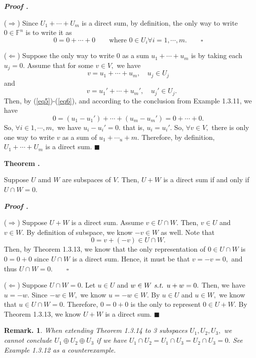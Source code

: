 \documentclass[11pt, letterpaper]{article}
\newcounter{index}[subsection]
\newenvironment*{thm}[1]{\begin{tcolorbox}\par\noindent\textbf{Theorem \thesubsection.\stepcounter{index}\theindex\ #1} \par}{\par\end{tcolorbox}}
\newcounter{nprf}[subsection]
\newenvironment*{prf}{\par\indent\textbf{\textit{Proof \stepcounter{nprf}\thenprf.}}}{\hfill$\blacksquare$\par}
\newtheorem*{rmk}{Remark.}
\def\F{\mathbb{F}}
\def\st{\emph{ s.t. }}
\begin{document}
	\begin{prf}
		\par ($\Rightarrow$) Since $U_1+\cdots+U_m$ is a direct sum, by definition, the only way to write $0\in\F^n$ is to write it as \[0=0+\cdots+0\qquad\text{where }0\in U_i\forall i=1,\cdots,m.\qquad\square\]\par 
		($\Leftarrow$) Suppose the only way to write $0$ as a sum $u_1+\cdots+u_m$ is by taking each $u_j=0.$ Assume that for some $v\in V,$ we have \begin{equation}\label{eq5}v=u_1+\cdots+u_m,\quad u_j\in U_j\end{equation}and\begin{equation}\label{eq6}\quad v=u_1'+\cdots+u_m',\quad u_j'\in U_j.\end{equation} Then, by (\ref{eq5})-(\ref{eq6}), and according to the conclusion from Example 1.3.11, we have \[0=(u_1-u_1')+\cdots+(u_m-u_m')=0+\cdots+0.\] So, $\forall i\in 1,\cdots,m,$ we have $u_i-u_i'=0.$ that is, $u_i=u_i'.$ So, $\forall v\in V,$ there is only one way to write $v$ as a sum of $u_1+\cdots_u+m.$ Therefore, by definition, $U_1+\cdots+U_m$ is a direct sum. 
	\end{prf}
\begin{thm}{}
	Suppose	$U$ amd $W$ are subspaces of $V$. Then, $U+W$ is a direct sum if and only if $U\cap W=\qty{0}$.
\end{thm}
	\begin{prf}
		\par ($\Rightarrow$) Suppose $U+W$ is a direct sum. Assume $v\in U\cap W.$ Then, $v\in U$ and $v\in W.$ By definition of subspace, we know $-v\in W$ as well. Note that \[0=v+(-v)\in U\cap W.\] Then, by Theorem 1.3.13, we know that the only representation of $0\in U\cap W$ is $0=0+0$ since $U\cap W$ is a direct sum. Hence, it must be that $v=-v=0,$ and thus $U\cap W=\qty{0}.\qquad\square$\par 
		($\Leftarrow$) Suppose $U\cap W=\qty{0}.$ Let $u\in U$ and $w\in W\st u+w=0.$ Then, we have $u=-w.$ Since $-w\in W,$ we know $u=-w\in W.$ By $u\in U$ and $u\in W,$ we know that $u\in U\cap W=\qty{0}.$ Therefore, $0=0+0$ is the only to represent $0\in U+W.$ By Theorem 1.3.13, we know $U+W$ is a direct sum.
	\end{prf}
\begin{rmk}
	When extending Theorem 1.3.14 to 3 subspaces $U_1,U_2,U_3,$ we cannot conclude $U_1\oplus U_2\oplus U_3$ if we have $U_1\cap U_2=U_1\cap U_3=U_2\cap U_3=\qty{0}.$ See Example 1.3.12 as a counterexample.
\end{rmk}
\end{document}

